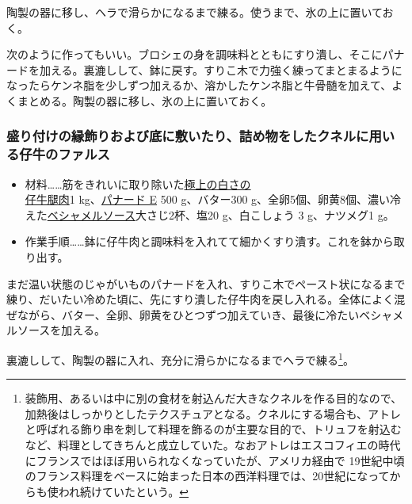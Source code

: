\begin{recette}
陶製の器に移し、ヘラで滑らかになるまで練る。使うまで、氷の上に置いておく。

次のように作ってもいい。ブロシェの身を調味料とともにすり潰し、そこにパナードを加える。裏漉しして、鉢に戻す。すりこ木で力強く練ってまとまるようになったらケンネ脂を少しずつ加えるか、溶かしたケンネ脂と牛骨髄を加えて、よくまとめる。陶製の器に移し、氷の上に置いておく。

\atoaki{}

\hypertarget{farce-de-veau-pour-bordures}{%
\subsubsection{盛り付けの縁飾りおよび底に敷いたり、詰め物をしたクネルに用いる仔牛のファルス}\label{farce-de-veau-pour-bordures}}



\begin{itemize}
\item
  材料\ldots{}\ldots{}筋をきれいに取り除いた\ul{極上の白さの\\仔牛腿肉}1
  kg、\protect\hyperlink{panade-e}{パナード E} 500 g、バター300
  g、全卵5個、卵黄8個、濃い冷えた\protect\hyperlink{sauce-bechamel}{ベシャメルソース}大さじ2杯、塩20
  g、白こしょう 3 g、ナツメグ1 g。
\item
  作業手順\ldots{}\ldots{}鉢に仔牛肉と調味料を入れてて細かくすり潰す。これを鉢から取り出す。
\end{itemize}

まだ温い状態のじゃがいものパナードを入れ、すりこ木でペースト状になるまで練り、だいたい冷めた頃に、先にすり潰した仔牛肉を戻し入れる。全体によく混ぜながら、バター、全卵、卵黄をひとつずつ加えていき、最後に冷たいベシャメルソースを加える。

裏漉しして、陶製の器に入れ、充分に滑らかになるまでヘラで練る\footnote{装飾用、あるいは中に別の食材を射込んだ大きなクネルを作る目的なので、加熱後はしっかりとしたテクスチュアとなる。クネルにする場合も、アトレと呼ばれる飾り串を刺して料理を飾るのが主要な目的で、トリュフを射込むなど、料理としてきちんと成立していた。なおアトレはエスコフィエの時代にフランスではほぼ用いられなくなっていたが、アメリカ経由で
  19世紀中頃のフランス料理をベースに始まった日本の西洋料理では、20世紀になってからも使われ続けていたという。}。


\end{recette}
